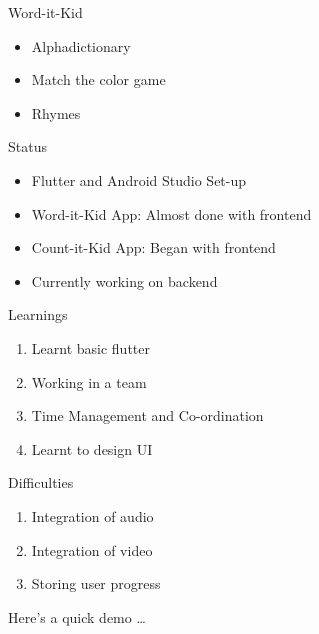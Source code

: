 \documentclass[14pt]{beamer}
\begin{document}
\begin{frame}{Word-it-Kid}
    \begin{itemize}
            \pause
        \item Alphadictionary
            \pause
        \item Match the color game
            \pause
        \item Rhymes
    \end{itemize}
\end{frame}

\begin{frame}{Status}
    \begin{itemize}
        \item Flutter and Android Studio Set-up
        \item Word-it-Kid App: Almost done with frontend
        \item Count-it-Kid App: Began with frontend
        \item Currently working on backend
    \end{itemize}
\end{frame}

\begin{frame}{Learnings}
    \begin{enumerate}
        \item Learnt basic flutter
        \item Working in a team
        \item Time Management and Co-ordination
        \item Learnt to design UI
    \end{enumerate}
\end{frame}

\begin{frame}{Difficulties}
    \begin{enumerate}
        \item Integration of audio
        \item Integration of video
        \item Storing user progress
    \end{enumerate}
\end{frame}

\begin{frame}[standout]
    Here's a quick demo \ldots
\end{frame}
\end{document}
